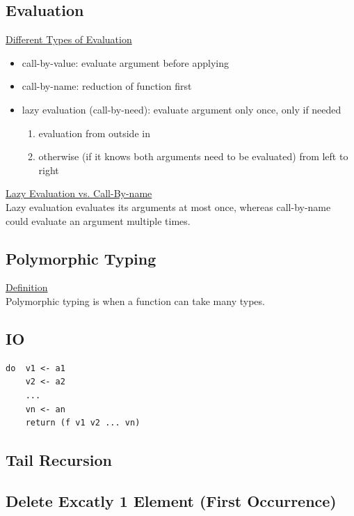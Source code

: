 \documentclass[10pt,landscape,a4paper]{article}
\begin{document}
\begin{multicols*}{5}
\subsection*{Evaluation}
\underline{Different Types of Evaluation}
\begin{itemize}
    \item call-by-value: evaluate argument before applying
    \item call-by-name:  reduction of function first
    \item lazy evaluation (call-by-need): evaluate argument only once, only if needed
    \begin{enumerate}
        \item evaluation from outside in
        \item otherwise (if it knows both arguments need to be evaluated)
        from left to right
    \end{enumerate}
\end{itemize}
\underline{Lazy Evaluation vs. Call-By-name} \\
Lazy evaluation evaluates its arguments at most once, whereas call-by-name could evaluate an argument multiple times.

\subsection*{Polymorphic Typing}
\underline{Definition} \\
Polymorphic typing is when a function can take many types.

\subsection*{IO}
\begin{verbatim}
do  v1 <- a1
    v2 <- a2
    ...
    vn <- an
    return (f v1 v2 ... vn)
\end{verbatim}

\subsection*{Tail Recursion}

\subsection*{Delete Excatly 1 Element (First Occurrence)}


\end{multicols*}
\end{document}

